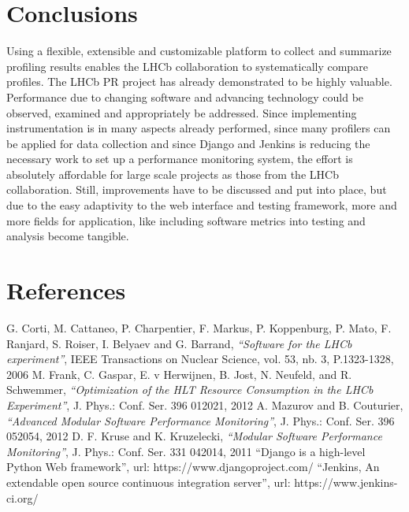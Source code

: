 \documentclass[a4paper]{jpconf}
\begin{document}
\section{Conclusions}
\label{sec:conclusions}

Using a flexible, extensible and customizable platform to collect and summarize profiling results enables the LHCb collaboration to systematically compare profiles. The LHCb PR project has already demonstrated to be highly valuable. Performance due to changing software and advancing technology could be observed, examined and appropriately be addressed. Since implementing instrumentation is in many aspects already performed, since many profilers can be applied for data collection and since Django and Jenkins is reducing the necessary work to set up a performance monitoring system, the effort is absolutely affordable for large scale projects as those from the LHCb collaboration. Still, improvements have to be discussed and put into place, but due to the easy adaptivity to the web interface and testing framework, more and more fields for application, like including software metrics into testing and analysis become tangible. 

\section*{References}

\begin{thebibliography}{3}
 G. Corti, M. Cattaneo, P. Charpentier, F. Markus, P. Koppenburg, P. Mato, F. Ranjard, S. Roiser, I. Belyaev and G. Barrand, {\it ``Software for the LHCb experiment''}, IEEE Transactions on Nuclear Science, vol. 53, nb. 3, P.1323-1328, 2006
M. Frank, C. Gaspar, E. v Herwijnen, B. Jost, N. Neufeld, and R. Schwemmer, {\it ``Optimization of the HLT Resource Consumption in the LHCb Experiment''}, J. Phys.: Conf. Ser. 396 012021, 2012
 A. Mazurov and B. Couturier, {\it ``Advanced Modular Software Performance Monitoring''}, J. Phys.: Conf. Ser. 396 052054, 2012
 D. F. Kruse and K. Kruzelecki, {\it ``Modular Software Performance Monitoring''}, J. Phys.: Conf. Ser. 331 042014, 2011
 ``Django is a high-level Python Web framework'', url: https://www.djangoproject.com/
 ``Jenkins, An extendable open source continuous integration server'', url: https://www.jenkins-ci.org/
\end{thebibliography}
\end{document}
